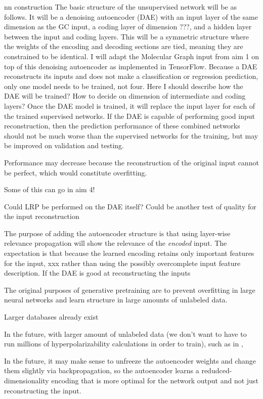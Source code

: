 \documentclass[12pt]{article}
\begin{document}
\begin{anfxnote}{nn construction}
The basic structure of the unsupervised network will be as follows. It will be a denoising autoencoder (DAE) with an input layer of the same dimension as the GC input, a coding layer of dimension ???, and a hidden layer between the input and coding layers. This will be a symmetric structure where the weights of the encoding and decoding sections are tied, meaning they are constrained to be identical. I will adapt the Molecular Graph input from aim 1 on top of this denoising autoencoder as implemented in TensorFlow\cite{tensorflow2015-whitepaper,github:tf,github:tf_dae}. Because a DAE reconstructs its inputs and does not make a classification or regression prediction, only one model needs to be trained, not four. Here I should describe how the DAE will be trained? How to decide on dimension of intermediate and coding layers? Once the DAE model is trained, it will replace the input layer for each of the trained supervised networks. If the DAE is capable of performing good input reconstruction, then the prediction performance of these combined networks should not be much worse than the supervised networks for the training, but may be improved on validation and testing.

Performance may decrease because the reconstruction of the original input cannot be perfect, which would constitute overfitting.

Some of this can go in aim 4!

Could LRP be performed on the DAE itself? Could be another test of quality for the input reconstruction

The purpose of adding the autoencoder structure is that using layer-wise relevance propagation will show the relevance of the \emph{encoded} input. The expectation is that because the learned encoding retains only important features for the input, xxx rather than using the possibly overcomplete input feature description. If the DAE is good at reconstructing the inputs

The original purposes of generative pretraining are to prevent overfitting in large neural networks and learn structure in large amounts of unlabeled data.

Larger databases already exist \cite{doi:10.1021/acs.jcim.7b00083}

In the future, with larger amount of unlabeled data (we don't want to have to run millions of hyperpolarizability calculations in order to train), such as in \parencite{doi:10.1021/acs.jcim.7b00083},

In the future, it may make sense to unfreeze the autoencoder weights and change them slightly via backpropagation, so the autoencoder learns a redudced-dimensionality encoding that is more optimal for the network output and not just reconstructing the input.
\end{anfxnote}
\end{document}
